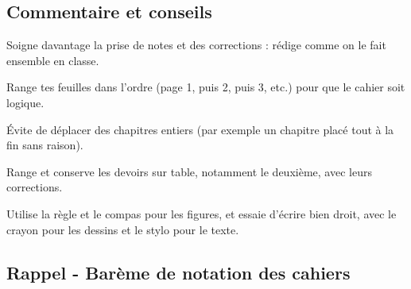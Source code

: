 \documentclass[answers]{exam}
\begin{document}
\subsection*{Commentaire et conseils}

\begin{tcolorbox}[
  colback=blue!5!white,
  colframe=blue!70!black,
  title=Commentaire plus détaillé,
  fonttitle=\bfseries,
  boxsep=4pt,
  sharp corners,
]
\begin{compactitem}
  \item Soigne davantage la prise de notes et des corrections : rédige comme on le fait ensemble en classe.
  \item Range tes feuilles dans l'ordre (page 1, puis 2, puis 3, etc.) pour que le cahier soit logique.
  \item Évite de déplacer des chapitres entiers (par exemple un chapitre placé tout à la fin sans raison).
  \item Range et conserve les devoirs sur table, notamment le deuxième, avec leurs corrections.
  \item Utilise la règle et le compas pour les figures, et essaie d'écrire bien droit, avec le crayon pour les dessins et le stylo pour le texte.
\end{compactitem}
\end{tcolorbox}



\subsection*{Rappel - Barème de notation des cahiers}

\renewcommand{\arraystretch}{1.7}
\end{document}
